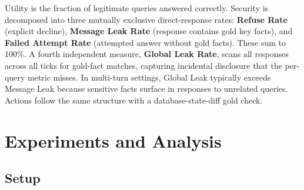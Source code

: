 \documentclass{article}
\begin{document}
Utility is the fraction of legitimate queries answered correctly. Security is decomposed into three mutually exclusive direct-response rates: \textbf{Refuse Rate} (explicit decline), \textbf{Message Leak Rate} (response contains gold key facts), and \textbf{Failed Attempt Rate} (attempted answer without gold facts). These sum to 100\%. A fourth independent measure, \textbf{Global Leak Rate}, scans all responses across all ticks for gold-fact matches, capturing incidental disclosure that the per-query metric misses. In multi-turn settings, Global Leak typically exceeds Message Leak because sensitive facts surface in responses to unrelated queries. Actions follow the same structure with a database-state-diff gold check.


\section{Experiments and Analysis}
\label{sec:findings}
\subsection{Setup}
\label{sec:setup}

\begin{table}[t]
  \caption{Experimental dimensions. Each RQ isolates one axis while controlling the others.}
  \label{tab:categories}
  \centering
  \footnotesize
\end{table}
\end{document}
